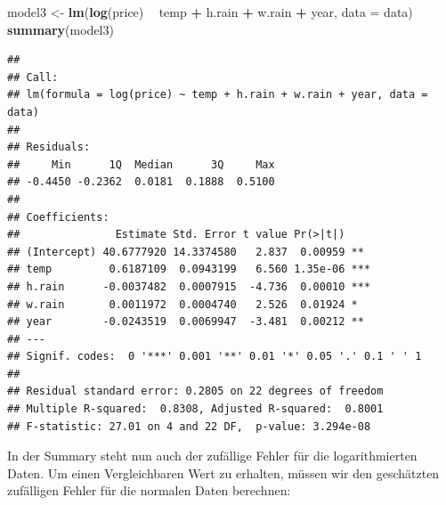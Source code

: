 \documentclass[]{article}
\newenvironment{Shaded}{\begin{snugshade}}{\end{snugshade}}
\newcommand{\DataTypeTok}[1]{\textcolor[rgb]{0.13,0.29,0.53}{#1}}
\newcommand{\DecValTok}[1]{\textcolor[rgb]{0.00,0.00,0.81}{#1}}
\newcommand{\KeywordTok}[1]{\textcolor[rgb]{0.13,0.29,0.53}{\textbf{#1}}}
\newcommand{\NormalTok}[1]{#1}
\newcommand{\OperatorTok}[1]{\textcolor[rgb]{0.81,0.36,0.00}{\textbf{#1}}}
\newcommand{\StringTok}[1]{\textcolor[rgb]{0.31,0.60,0.02}{#1}}
\begin{document}
\begin{Shaded}
\begin{Highlighting}[]
\NormalTok{model3 <-}\StringTok{ }\KeywordTok{lm}\NormalTok{(}\KeywordTok{log}\NormalTok{(price) }\OperatorTok{~}\StringTok{ }\NormalTok{temp }\OperatorTok{+}\StringTok{ }\NormalTok{h.rain }\OperatorTok{+}\StringTok{ }\NormalTok{w.rain }\OperatorTok{+}\StringTok{ }\NormalTok{year, }\DataTypeTok{data =}\NormalTok{ data)}
\KeywordTok{summary}\NormalTok{(model3)}
\end{Highlighting}
\end{Shaded}

\begin{verbatim}
## 
## Call:
## lm(formula = log(price) ~ temp + h.rain + w.rain + year, data = data)
## 
## Residuals:
##     Min      1Q  Median      3Q     Max 
## -0.4450 -0.2362  0.0181  0.1888  0.5100 
## 
## Coefficients:
##               Estimate Std. Error t value Pr(>|t|)    
## (Intercept) 40.6777920 14.3374580   2.837  0.00959 ** 
## temp         0.6187109  0.0943199   6.560 1.35e-06 ***
## h.rain      -0.0037482  0.0007915  -4.736  0.00010 ***
## w.rain       0.0011972  0.0004740   2.526  0.01924 *  
## year        -0.0243519  0.0069947  -3.481  0.00212 ** 
## ---
## Signif. codes:  0 '***' 0.001 '**' 0.01 '*' 0.05 '.' 0.1 ' ' 1
## 
## Residual standard error: 0.2805 on 22 degrees of freedom
## Multiple R-squared:  0.8308, Adjusted R-squared:  0.8001 
## F-statistic: 27.01 on 4 and 22 DF,  p-value: 3.294e-08
\end{verbatim}

In der Summary steht nun auch der zufällige Fehler für die logarithmierten Daten. Um einen Vergleichbaren Wert zu erhalten,
müssen wir den geschätzten zufälligen Fehler für die normalen Daten berechnen:

\begin{Shaded}
\end{Shaded}
\end{document}
